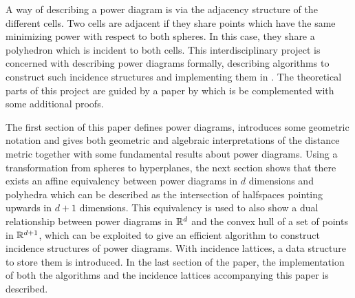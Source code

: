 A way of describing a power diagram is via the adjacency structure of the different cells.
Two cells are adjacent if they share points which have the same minimizing power with respect to both spheres.
In this case, they share a polyhedron which is incident to both cells.
This interdisciplinary project is concerned with describing power diagrams formally, describing algorithms to construct such incidence structures and implementing them in \CC.
The theoretical parts of this project are guided by a paper by \textcite{aurenhammer1987power} which is be complemented with some additional proofs.

The first section of this paper defines power diagrams, introduces some geometric notation and gives both geometric and algebraic interpretations of the distance metric together with some fundamental results about power diagrams.
Using a transformation from spheres to hyperplanes, the next section shows that there exists an affine equivalency between power diagrams in $d$ dimensions and polyhedra which can be described as the intersection of halfspaces pointing upwards in $d+1$ dimensions.
This equivalency is used to also show a dual relationship between power diagrams in $\mathbb{R}^d$ and the convex hull of a set of points in $\mathbb{R}^{d+1}$, which can be exploited to give an efficient algorithm to construct incidence structures of power diagrams.
With incidence lattices, a data structure to store them is introduced.
In the last section of the paper, the implementation of both the algorithms and the incidence lattices accompanying this paper is described.

